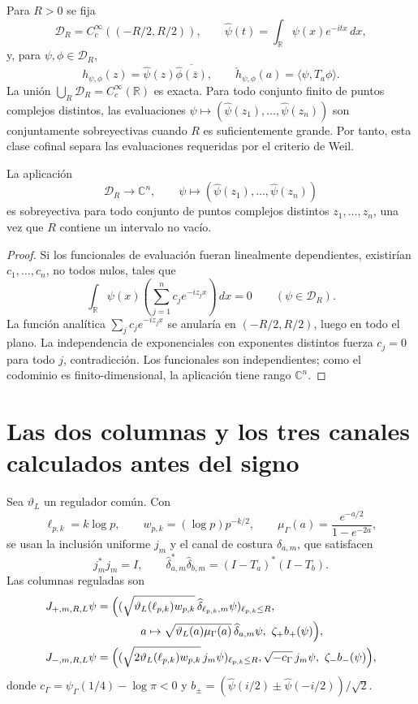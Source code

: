 Para $R>0$ se fija
\[
 \mathcal D_R=C_c^\infty((-R/2,R/2)),\qquad
 \widehat\psi(t)=\int_{\mathbb R}\psi(x)e^{-itx}\,dx,
\]
y, para $\psi,\phi\in\mathcal D_R$,
\[
 h_{\psi,\phi}(z)=\widehat\psi(z)
 \overline{\widehat\phi(\overline z)},\qquad
 \check h_{\psi,\phi}(a)=\langle\psi,T_a\phi\rangle.
\]
La unión $\bigcup_R\mathcal D_R=C_c^\infty(\mathbb R)$ es exacta. Para todo
conjunto finito de puntos complejos distintos, las evaluaciones
$\psi\mapsto(\widehat\psi(z_1),\ldots,\widehat\psi(z_n))$ son conjuntamente
sobreyectivas cuando $R$ es suficientemente grande. Por tanto, esta clase cofinal
separa las evaluaciones requeridas por el criterio de Weil.

\begin{lemma}
\label{lem:pdf2-rh-separacion}
La aplicación
\[
 \mathcal D_R\longrightarrow\mathbb C^n,
 \qquad
 \psi\longmapsto
 (\widehat\psi(z_1),\ldots,\widehat\psi(z_n))
\]
es sobreyectiva para todo conjunto de puntos complejos distintos
\(z_1,\ldots,z_n\), una vez que \(R\) contiene un intervalo no vacío.
\end{lemma}

\begin{proof}
Si los funcionales de evaluación fueran linealmente dependientes, existirían
\(c_1,\ldots,c_n\), no todos nulos, tales que
\[
 \int_{\mathbb R}\psi(x)
 \left(\sum_{j=1}^nc_je^{-iz_jx}\right)\,dx=0
 \qquad(\psi\in\mathcal D_R).
\]
La función analítica \(\sum_jc_je^{-iz_jx}\) se anularía en
\((-R/2,R/2)\), luego en todo el plano. La independencia de exponenciales
con exponentes distintos fuerza \(c_j=0\) para todo \(j\), contradicción.
Los funcionales son independientes; como el codominio es finito-dimensional,
la aplicación tiene rango \(\mathbb C^n\).
\end{proof}

\section{Las dos columnas y los tres canales calculados antes del signo}

Sea $\vartheta_L$ un regulador común. Con
\[
 \ell_{p,k}=k\log p,\qquad w_{p,k}=(\log p)p^{-k/2},\qquad
 \mu_\Gamma(a)=\frac{e^{-a/2}}{1-e^{-2a}},
\]
se usan la inclusión uniforme $j_m$ y el canal de costura
$\widehat\delta_{a,m}$, que satisfacen
\[
 j_m^*j_m=I,\qquad
 \widehat\delta_{a,m}^*\widehat\delta_{b,m}
 =(I-T_a)^*(I-T_b).
\]
Las columnas reguladas son
\begin{align*}
 J_{+,m,R,L}\psi={}&
 \Bigl(
  (\sqrt{\vartheta_L(\ell_{p,k})w_{p,k}}\,
       \widehat\delta_{\ell_{p,k},m}\psi)_{\ell_{p,k}\leq R},\\
 &\hspace{9mm}a\mapsto
  \sqrt{\vartheta_L(a)\mu_\Gamma(a)}\,
       \widehat\delta_{a,m}\psi,\ \zeta_+b_+(\psi)
 \Bigr),\\
 J_{-,m,R,L}\psi={}&
 \Bigl(
  (\sqrt{2\vartheta_L(\ell_{p,k})w_{p,k}}\,j_m\psi)_{\ell_{p,k}\leq R},
  \sqrt{-c_\Gamma}\,j_m\psi,\ \zeta_-b_-(\psi)
 \Bigr),
\end{align*}
donde $c_\Gamma=\psi_\Gamma(1/4)-\log\pi<0$ y
$b_\pm=(\widehat\psi(i/2)\pm\widehat\psi(-i/2))/\sqrt2$.

